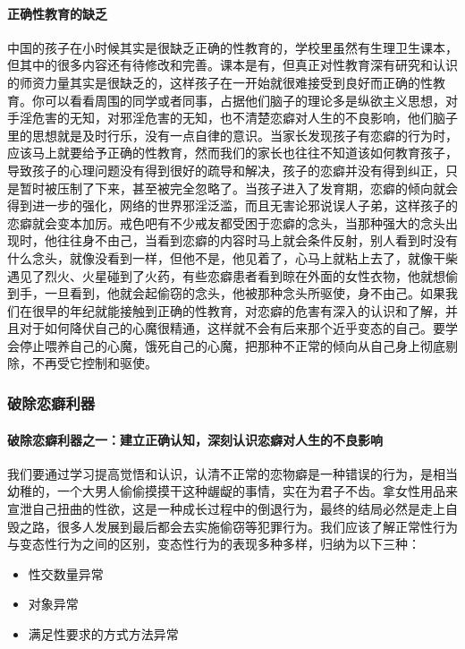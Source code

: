 \paragraph{正确性教育的缺乏}

中国的孩子在小时候其实是很缺乏正确的性教育的，学校里虽然有生理卫生课本，但其中的很多内容还有待修改和完善。课本是有，但真正对性教育深有研究和认识的师资力量其实是很缺乏的，这样孩子在一开始就很难接受到良好而正确的性教育。你可以看看周围的同学或者同事，占据他们脑子的理论多是纵欲主义思想，对手淫危害的无知，对邪淫危害的无知，也不清楚恋癖对人生的不良影响，他们脑子里的思想就是及时行乐，没有一点自律的意识。当家长发现孩子有恋癖的行为时，应该马上就要给予正确的性教育，然而我们的家长也往往不知道该如何教育孩子，导致孩子的心理问题没有得到很好的疏导和解决，孩子的恋癖并没有得到纠正，只是暂时被压制了下来，甚至被完全忽略了。当孩子进入了发育期，恋癖的倾向就会得到进一步的强化，网络的世界邪淫泛滥，而且无害论邪说误人子弟，这样孩子的恋癖就会变本加厉。戒色吧有不少戒友都受困于恋癖的念头，当那种强大的念头出现时，他往往身不由己，当看到恋癖的内容时马上就会条件反射，别人看到时没有什么念头，就像没看到一样，但他不是，他见着了，心马上就粘上去了，就像干柴遇见了烈火、火星碰到了火药，有些恋癖患者看到晾在外面的女性衣物，他就想偷到手，一旦看到，他就会起偷窃的念头，他被那种念头所驱使，身不由己。如果我们在很早的年纪就能接触到正确的性教育，对恋癖的危害有深入的认识和了解，并且对于如何降伏自己的心魔很精通，这样就不会有后来那个近乎变态的自己。要学会停止喂养自己的心魔，饿死自己的心魔，把那种不正常的倾向从自己身上彻底剔除，不再受它控制和驱使。

\subsubsection{破除恋癖利器}

\paragraph{破除恋癖利器之一：建立正确认知，深刻认识恋癖对人生的不良影响}

我们要通过学习提高觉悟和认识，认清不正常的恋物癖是一种错误的行为，是相当幼稚的，一个大男人偷偷摸摸干这种龌龊的事情，实在为君子不齿。拿女性用品来宣泄自己扭曲的性欲，这是一种成长过程中的倒退行为，最终的结局必然是走上自毁之路，很多人发展到最后都会去实施偷窃等犯罪行为。我们应该了解正常性行为与变态性行为之间的区别，变态性行为的表现多种多样，归纳为以下三种：

\begin{multicols}{3}
    \begin{itemize}
        \item 性交数量异常
        \item 对象异常
        \item 满足性要求的方式方法异常
    \end{itemize}
\end{multicols}

